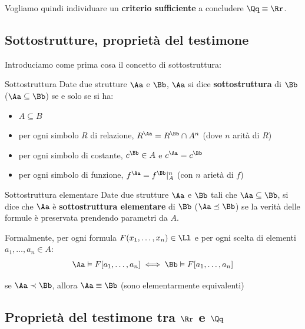 \documentclass[a4paper,11pt]{report}
\begin{document}
Vogliamo quindi individuare un \textbf{criterio sufficiente} a concludere \( \Qq \equiv \Rr\).

\subsection{Sottostrutture, proprietà del testimone}

Introduciamo come prima cosa il concetto di sottostruttura:

\begin{defframe}{Sottostruttura}{}
    Date due strutture \( \Aa \) e \( \Bb \), \( \Aa \) si dice \textbf{sottostruttura} di \( \Bb \) (\( \Aa \subseteq  \Bb \)) se e solo se si ha:
    \begin{itemize}
        \item \( A \subseteq B \)
        \item per ogni simbolo \( R \) di relazione, \( R^\Aa = R^\Bb \cap A^n \) (dove \( n \) arità di \( R \))
        \item per ogni simbolo di costante, \( c^\Bb \in A \) e \( c^\Aa = c^\Bb \)
        \item per ogni simbolo di funzione, \(f^\Aa = f^\Bb \vert_A^n \) (con \( n \) arietà di \( f \))
    \end{itemize}

\end{defframe}

\begin{defframe}{Sottostruttura elementare}{}
    Date due strutture \( \Aa \) e \( \Bb \) tali che \( \Aa \subseteq \Bb \), si dice che \( \Aa \) è \textbf{sottostruttura elementare} di \( \Bb \) (\( \Aa \preceq \Bb \)) se la verità delle formule è preservata prendendo parametri da \( A \).
    
    Formalmente, per ogni formula \( F(x_1, \dots, x_n) \in \Ll \) e per ogni scelta di elementi \( a_1, \dots, a_n \in A \):
    \[ \Aa \vDash F[a_1, \dots, a_n] \iff \Bb \vDash F[a_1, \dots, a_n] \]
    
\begin{gframe}{}
        se \( \Aa \prec \Bb \), allora \( \Aa \equiv \Bb \) (sono elementarmente equivalenti)
\end{gframe}

\end{defframe}

\subsection{Proprietà del testimone tra \( \Rr \) e \(\Qq\)}
\end{document}
